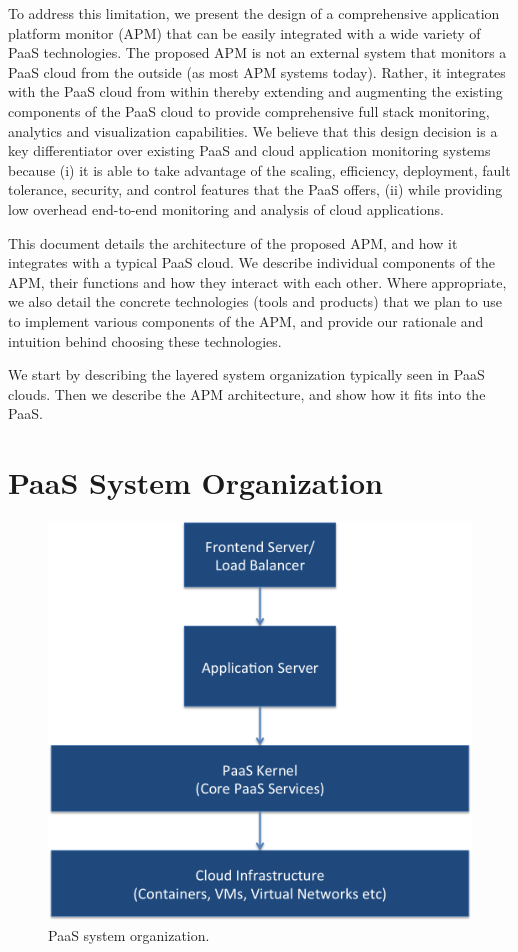 \documentclass[11pt]{article}
\begin{document}
To address this limitation, we present the design of 
a comprehensive application platform 
monitor (APM) that can be easily integrated with a wide variety of PaaS technologies. The proposed
APM is not an external system that monitors a PaaS cloud from the outside (as most APM systems today). Rather, it integrates with
the PaaS cloud from within thereby extending and augmenting the existing components of the PaaS cloud
to provide comprehensive full stack monitoring, analytics and visualization capabilities. We believe that this design decision is a key differentiator over existing PaaS and cloud application monitoring systems because (i) it is
able to take advantage of the scaling, efficiency, deployment, fault tolerance, security, and control features that the PaaS offers, (ii) while providing low overhead end-to-end monitoring and analysis of cloud applications.

This document details the architecture of the proposed APM, and how it integrates with a typical PaaS
cloud. We describe individual components of the APM, their functions and how they interact with each
other. Where appropriate, we also detail the concrete technologies (tools and products) that we plan to use to implement
various components of the APM, and provide our rationale and intuition behind choosing these technologies.

We start by describing the layered system organization typically seen in PaaS clouds. Then we describe
the APM architecture, and show how it fits into the PaaS.

\section{PaaS System Organization}
\begin{figure}
\centering
\includegraphics[scale=0.5]{paas_architecture}
\caption{PaaS system organization.}
\label{fig:paas_architecture}
\end{figure}
\end{document}
